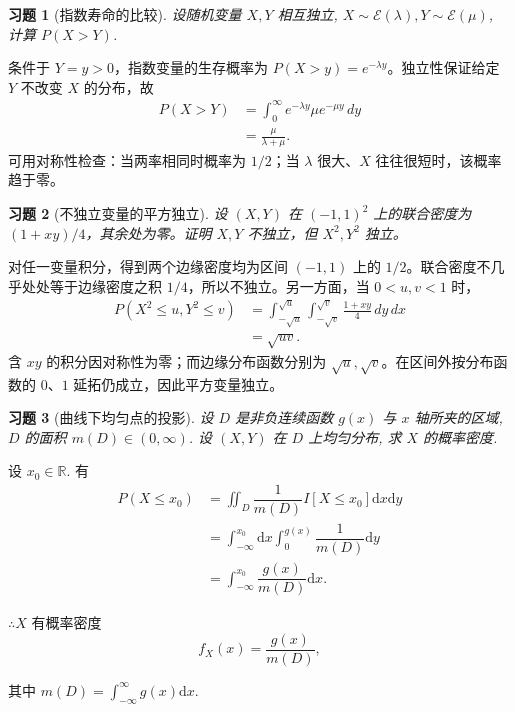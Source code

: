 \documentclass[UTF8,12pt,a4paper,fontset=fandol]{ctexart}
\newtheorem{exercise}{习题}[section]
\begin{document}
\begin{exercise}[指数寿命的比较]\label{q:A4.14}
设随机变量 $X,Y$ 相互独立, $X\sim\mathcal{E}(\lambda),Y\sim\mathcal{E}(\mu)$, 计算 $P(X>Y)$.\par{}
\end{exercise}

\begin{solve}\label{a:A4.14}条件于 $Y=y>0$，指数变量的生存概率为 $P(X>y)=e^{-\lambda y}$。独立性保证给定 $Y$ 不改变 $X$ 的分布，故\[\begin{aligned}P(X>Y)&=\int_0^\infty e^{-\lambda y}\mu e^{-\mu y}\,dy\\&=\frac\mu{\lambda+\mu}.\end{aligned}\]可用对称性检查：当两率相同时概率为 $1/2$；当 $\lambda$ 很大、$X$ 往往很短时，该概率趋于零。\end{solve}

\begin{exercise}[不独立变量的平方独立]\label{q:A4.17}
设 $(X,Y)$ 在 $(-1,1)^2$ 上的联合密度为 $(1+xy)/4$，其余处为零。证明 $X,Y$ 不独立，但 $X^2,Y^2$ 独立。\par{}
\end{exercise}

\begin{solve}\label{a:A4.17}对任一变量积分，得到两个边缘密度均为区间 $(-1,1)$ 上的 $1/2$。联合密度不几乎处处等于边缘密度之积 $1/4$，所以不独立。另一方面，当 $0<u,v<1$ 时，\[\begin{aligned}P(X^2\le u,Y^2\le v)&=\int_{-\sqrt u}^{\sqrt u}\int_{-\sqrt v}^{\sqrt v}\frac{1+xy}{4}\,dy\,dx\\&=\sqrt{uv}.\end{aligned}\]含 $xy$ 的积分因对称性为零；而边缘分布函数分别为 $\sqrt u,\sqrt v$。在区间外按分布函数的 $0$、$1$ 延拓仍成立，因此平方变量独立。\end{solve}

\begin{exercise}[曲线下均匀点的投影]\label{q:A4.18}
设 $D$ 是非负连续函数 $g(x)$ 与 $x$ 轴所夹的区域, $D$ 的面积 $m(D)\in(0,\infty)$. 设 $(X,Y)$ 在 $D$ 上均匀分布, 求 $X$ 的概率密度.\par{}
\end{exercise}

\begin{solve}\label{a:A4.18}
    设 $x_0\in\mathbb{R}$. 有
    \begin{align*}
        P(X\leq x_0) & =\iint_D\dfrac{1}{m(D)}I[X\leq x_0]\mathrm{d}x\mathrm{d}y \\
        & =\int_{-\infty}^{x_0}\mathrm{d}x\int_0^{g(x)}\dfrac{1}{m(D)}\mathrm{d}y \\
        & =\int_{-\infty}^{x_0}\dfrac{g(x)}{m(D)}\mathrm{d}x.
    \end{align*}

    $\therefore X$ 有概率密度
    \[f_X(x)=\dfrac{g(x)}{m(D)},\]

    其中 $m(D)=\int_{-\infty}^\infty g(x)\mathrm{d}x$.
\end{solve}
\end{document}
